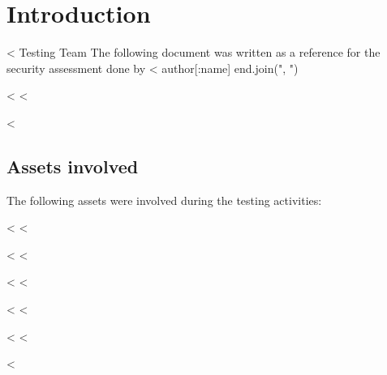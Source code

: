 

\chapter{Introduction}\label{cha:introduction}

  <%
         Testing Team %
  The following document was written as a reference for the security
  assessment done by <%
    author[:name]
  end.join(", ") %

  <%
  <%

  <%
  \section{Assets involved}\label{sec:assets-involved}

    The following assets were involved during the testing activities:

    \begin{itemize}
      <%
        <%
          \item \textbf{<%
        <%
          \item \textbf{<%
        <%
      <%
    \end{itemize}

  <%
  <%

  <%
  <%

  <%
  <%

  <%
  <%

  <%
  <%


  <%
